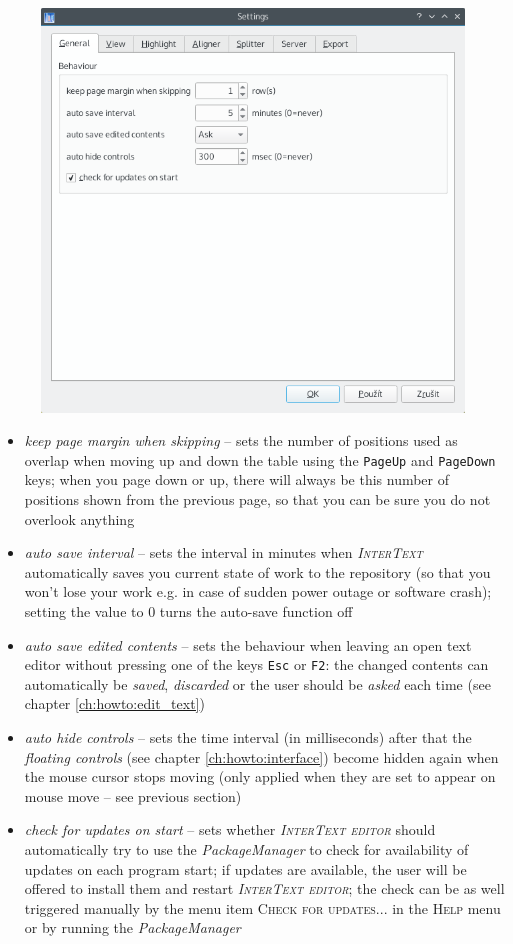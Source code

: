 \documentclass[a4paper,10pt,oneside]{book}
\newcommand{\IT}{\textit{\textsc{InterText}}\xspace}
\newcommand{\ITeditor}{\textit{\textsc{InterText editor}}\xspace}
\newcommand{\keys}[1]{\texttt{#1}}
\newcommand{\menu}[1]{\textsc{#1}}
\begin{document}
\begin{figure}[htb]
 \includegraphics[width=\textwidth]{screenshots/settings_general.png}
\end{figure}

\begin{itemize}
 \item \emph{keep page margin when skipping} -- sets the number of positions used as overlap when moving up and down the table using the \keys{PageUp} and \keys{PageDown} keys; when you page down or up, there will always be this number of positions shown from the previous page, so that you can be sure you do not overlook anything
 \item \emph{auto save interval} -- sets the interval in minutes when \IT automatically saves you current state of work to the repository (so that you won't lose your work e.g. in case of sudden power outage or software crash); setting the value to 0 turns the auto-save function off
 \item \emph{auto save edited contents} -- sets the behaviour when leaving an open text editor without pressing one of the keys \keys{Esc} or \keys{F2}: the changed contents can automatically be \emph{saved}, \emph{discarded} or the user should be \emph{asked} each time (see chapter \ref{ch:howto:edit_text})
 \item \emph{auto hide controls} -- sets the time interval (in milliseconds) after that the \emph{floating controls} (see chapter \ref{ch:howto:interface}) become hidden again when the mouse cursor stops moving (only applied when they are set to appear on mouse move -- see previous section)
 \item \emph{check for updates on start} -- sets whether \ITeditor should automatically try to use the \emph{PackageManager} to check for availability of updates on each program start; if updates are available, the user will be offered to install them and restart \ITeditor; the check can be as well triggered manually by the menu item \menu{Check for updates...} in the \menu{Help} menu or by running the \emph{PackageManager}
\end{itemize}
\end{document}
